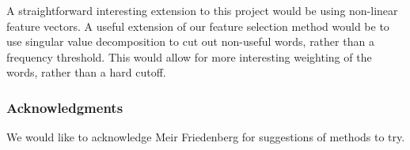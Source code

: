 \documentclass{article} %
\begin{document}
	A straightforward interesting extension to this project would be using non-linear feature vectors. A useful extension of our feature selection method would be to use singular value decomposition to cut out non-useful words, rather than a frequency threshold. This would allow for more interesting weighting of the words, rather than a hard cutoff.
	
	\subsubsection*{Acknowledgments}
	
	We would like to acknowledge Meir Friedenberg for suggestions of methods to try.
	
	
	
	
	
\end{document}
